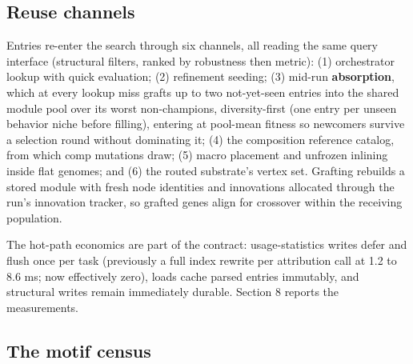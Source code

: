 \documentclass[11pt]{article}
\begin{document}
\subsection{Reuse channels}

Entries re-enter the search through six channels, all reading the same query interface (structural filters, ranked by robustness then metric): (1) orchestrator lookup with quick evaluation; (2) refinement seeding; (3) mid-run \textbf{absorption}, which at every lookup miss grafts up to two not-yet-seen entries into the shared module pool over its worst non-champions, diversity-first (one entry per unseen behavior niche before filling), entering at pool-mean fitness so newcomers survive a selection round without dominating it; (4) the composition reference catalog, from which comp mutations draw; (5) macro placement and unfrozen inlining inside flat genomes; and (6) the routed substrate's vertex set. Grafting rebuilds a stored module with fresh node identities and innovations allocated through the run's innovation tracker, so grafted genes align for crossover within the receiving population.

The hot-path economics are part of the contract: usage-statistics writes defer and flush once per task (previously a full index rewrite per attribution call at 1.2 to 8.6 ms; now effectively zero), loads cache parsed entries immutably, and structural writes remain immediately durable. Section 8 reports the measurements.

\subsection{The motif census}
\end{document}
